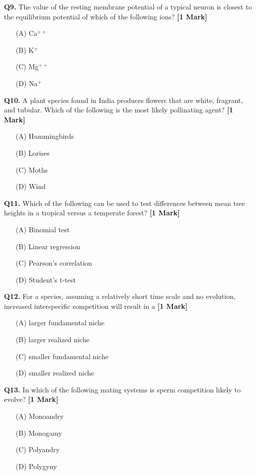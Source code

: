 \documentclass[11pt]{article}
\newcommand{\questiona}[2]{
    \noindent\textbf{Q#2.} #1 \hfill \textbf{[1 Mark]}
}
\begin{document}
\questiona{The value of the resting membrane potential of a typical neuron is closest to the equilibrium potential of which of the following ions?}{9}
\begin{enumerate}
    \item[(A)] Ca\(^{++}\)
    \item[(B)] K\(^{+}\)
    \item[(C)] Mg\(^{++}\)
    \item[(D)] Na\(^{+}\)
\end{enumerate}
\vspace{0.5cm}

\questiona{A plant species found in India produces flowers that are white, fragrant, and tubular. Which of the following is the most likely pollinating agent?}{10}
\begin{enumerate}
    \item[(A)] Hummingbirds
    \item[(B)] Lorises
    \item[(C)] Moths
    \item[(D)] Wind
\end{enumerate}
\vspace{0.5cm}

\questiona{Which of the following can be used to test differences between mean tree heights in a tropical versus a temperate forest?}{11}
\begin{enumerate}
    \item[(A)] Binomial test
    \item[(B)] Linear regression
    \item[(C)] Pearson’s correlation
    \item[(D)] Student’s t-test
\end{enumerate}
\vspace{0.5cm}

\questiona{For a species, assuming a relatively short time scale and no evolution, increased interspecific competition will result in a}{12}
\begin{enumerate}
    \item[(A)] larger fundamental niche
    \item[(B)] larger realized niche
    \item[(C)] smaller fundamental niche
    \item[(D)] smaller realized niche
\end{enumerate}
\vspace{0.5cm}

\questiona{In which of the following mating systems is sperm competition likely to evolve?}{13}
\begin{enumerate}
    \item[(A)] Monoandry
    \item[(B)] Monogamy
    \item[(C)] Polyandry
    \item[(D)] Polygyny
\end{enumerate}
\vspace{0.5cm}
\end{document}
